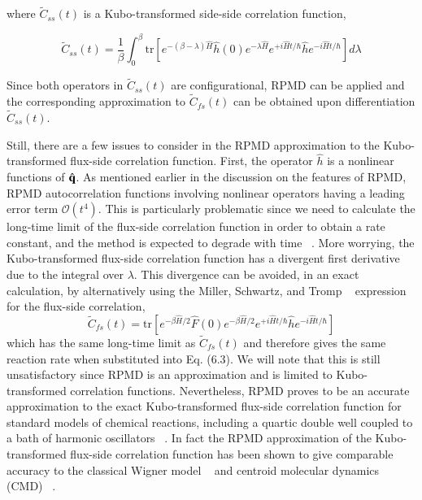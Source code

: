 \documentclass[phd,tocprelim]{cornell}
\begin{document}
 where $\tilde{C}_{ss}(t)$ is a Kubo-transformed side-side correlation function,
 
 \begin{equation}
\tilde{C}_{ss}(t)= \frac{1}{\beta} \int_{0}^{\beta} \textrm{tr}[ e^{-(\beta - \lambda)\hat{H}} \hat{h}(0) e^{-\lambda \hat{H}} e^{+i \hat{H}t/\hbar} \hat{h}e^{-i \hat{H}t/\hbar} ]d\lambda
\end{equation}
 
 Since both operators in $\tilde{C}_{ss}(t)$ are configurational, RPMD can be applied and the corresponding approximation to $\tilde{C}_{fs}(t)$ can be obtained upon differentiation $\tilde{C}_{ss}(t)$. 
 
Still, there are a few issues to consider in the RPMD approximation to the Kubo-transformed flux-side correlation function. First, the operator $\hat{h}$ is a nonlinear functions of ${\hat{\bf{q}}}$. As mentioned earlier in the discussion on the features of RPMD, RPMD autocorrelation functions involving nonlinear operators having a leading error term $\mathcal{O}(t^4)$. This is particularly problematic  since we need to calculate the long-time limit of the flux-side correlation function in order to obtain a rate constant, and the method is expected to degrade with time ~\cite{MANO2006}. More worrying, the Kubo-transformed flux-side correlation function has a divergent first derivative due to the integral over $\lambda$. 
 This divergence can be avoided, in an exact calculation, by alternatively using the Miller, Schwartz, and Tromp ~\cite{TROMP1983} expression for the flux-side correlation, 
 \begin{equation}
\tilde{C}_{fs}(t)= \textrm{tr}[ e^{-\beta\hat{H}/2} \hat{F}(0) e^{-\beta\hat{H}/2} e^{+i \hat{H}t/\hbar} \hat{h}e^{-i \hat{H}t/\hbar} ]
\end{equation}
 which has the same long-time limit as $\tilde{C}_{fs}(t)$ and therefore gives the same reaction rate when substituted into Eq. (6.3). We will note that this is still unsatisfactory since RPMD is an approximation and is limited to Kubo-transformed correlation functions. Nevertheless, RPMD proves to be an accurate approximation to the exact Kubo-transformed flux-side correlation function for standard models of chemical reactions, including a quartic double well coupled to a bath of harmonic oscillators ~\cite{MANO2005}. In fact the RPMD approximation of the Kubo-transformed flux-side correlation function has been shown to give comparable accuracy to the classical Wigner model ~\cite{MILLER1998,MILLER1998-2} and centroid molecular dynamics (CMD) ~\cite{VOTH2001}.
 
\end{document}
